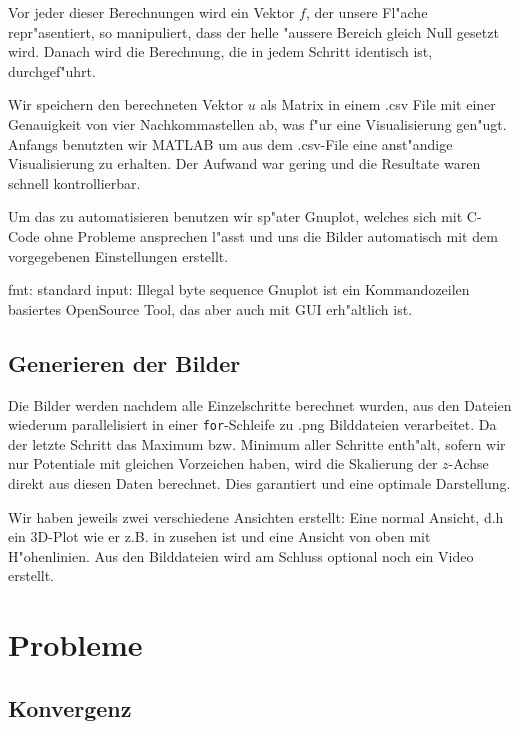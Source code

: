\begin{refsection}
Vor jeder dieser Berechnungen wird ein Vektor $f$, der unsere Fl"ache
repr"asentiert, so manipuliert, dass der helle "aussere Bereich
gleich Null gesetzt wird. Danach wird die Berechnung, die in jedem
Schritt identisch ist, durchgef"uhrt.
		
Wir speichern den berechneten Vektor $u$ als Matrix in einem .csv
File mit einer Genauigkeit von vier Nachkommastellen ab, was f"ur
eine Visualisierung gen"ugt. Anfangs benutzten wir MATLAB um aus
dem .csv-File eine anst"andige Visualisierung zu erhalten. Der
Aufwand war gering und die Resultate waren schnell kontrollierbar.
		

		
Um das zu automatisieren benutzen wir sp"ater Gnuplot, welches sich
mit C-Code ohne Probleme ansprechen l"asst und uns die Bilder
automatisch mit dem vorgegebenen Einstellungen erstellt.
		
fmt: standard input: Illegal byte sequence
Gnuplot ist ein Kommandozeilen basiertes OpenSource Tool, das aber
auch mit GUI erh"altlich ist.
		

	
\subsection{Generieren der Bilder}
	
Die Bilder werden nachdem alle Einzelschritte berechnet wurden, aus
den Dateien wiederum parallelisiert in einer \verb|for|-Schleife
zu .png Bilddateien verarbeitet. Da der letzte Schritt das Maximum
bzw. Minimum aller Schritte enth"alt, sofern wir nur Potentiale mit
gleichen Vorzeichen haben, wird die Skalierung der $z$-Achse direkt
aus diesen Daten berechnet. Dies garantiert und eine optimale
Darstellung.
		
Wir haben jeweils zwei verschiedene Ansichten erstellt: Eine normal
Ansicht, d.h ein 3D-Plot wie er z.B. in  zusehen
ist und eine Ansicht von oben mit H"ohenlinien. Aus den Bilddateien
wird am Schluss optional noch ein Video erstellt.
		
\section{Probleme}

\subsection{Konvergenz}
	

\end{refsection}
